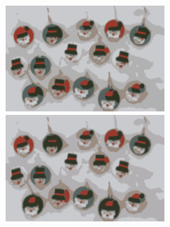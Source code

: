 \begin{center}
\begin{figure}[H]
\centering\includegraphics[width=6cm]{./imgkmeanscluster06-04.png}
\centering\includegraphics[width=6cm]{./imgkmeanscluster06-05.png}\\
\end{figure}
\end{center}

